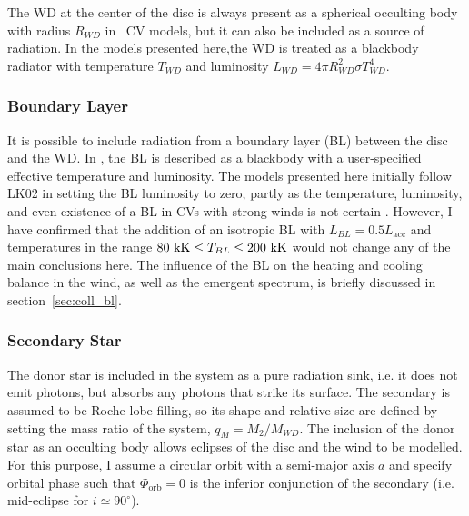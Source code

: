 The WD at the center of the disc is always present as a spherical occulting
body with radius $R_{WD}$ in \py\ CV models, but it can also be included
as a source of radiation. In the models presented here,the
WD is treated as a blackbody radiator with temperature $T_{WD}$ and luminosity
$L_{WD} = 4\pi R_{WD}^2 \sigma T_{WD}^4$. 

\subsubsection{Boundary Layer}

It is possible to include radiation from a boundary layer (BL) between
the disc and the WD. In \py, the BL is described as
a blackbody with a user-specified effective temperature and
luminosity. The models presented here initially follow LK02 in setting
the BL luminosity to zero, partly as the temperature, luminosity, and even
existence of a BL in CVs with strong winds is not certain \citep{hoaredrew1993}.
However, I have confirmed that the addition 
of an isotropic BL with $L_{BL} = 0.5 L_{\mathrm{acc}}$ and temperatures in 
the range $80~{\rm kK} \leq T_{BL} \leq 200~{\rm kK}$ would not change 
any of the main conclusions here. 
The influence of the BL on the heating and cooling balance
in the wind, as well as the emergent spectrum, is briefly discussed in
section~\ref{sec:coll_bl}.


\subsubsection{Secondary Star}

The donor star is included in the system as a pure radiation sink, 
i.e. it does not emit photons, but absorbs any photons that strike its
surface. The secondary is assumed to be Roche-lobe filling, so its
shape and relative size are defined by setting the mass ratio of the system, 
$q_M = M_2/M_{WD}$. The inclusion of the donor star as an occulting body
allows eclipses of the disc and the wind to be modelled. For this
purpose, I assume a circular orbit with a semi-major axis $a$ and 
specify orbital phase such that $\Phi_{\mathrm{orb}} = 0$ is the
inferior conjunction of the secondary (i.e. mid-eclipse for $i \simeq
90^\circ$).




%
%


